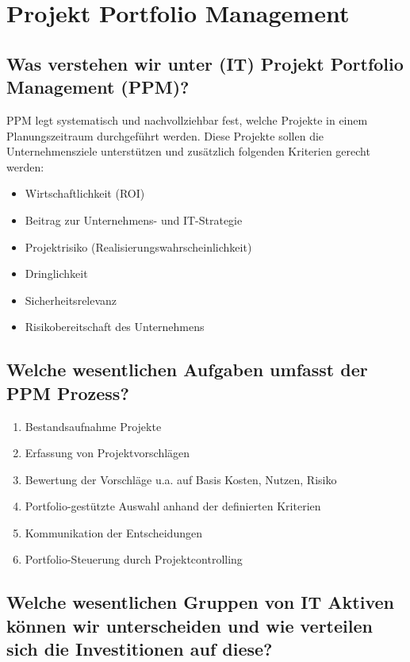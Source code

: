 \chapter{Projekt Portfolio Management}

\section{Was verstehen wir unter (IT) Projekt Portfolio Management (PPM)?}

PPM legt systematisch und nachvollziehbar fest, welche Projekte in einem Planungszeitraum durchgeführt werden. Diese Projekte sollen die Unternehmensziele unterstützen und zusätzlich folgenden Kriterien gerecht werden:
\begin{itemize}
	\item Wirtschaftlichkeit (ROI)
	\item Beitrag zur Unternehmens- und IT-Strategie
	\item Projektrisiko (Realisierungswahrscheinlichkeit)
	\item Dringlichkeit
	\item Sicherheitsrelevanz
	\item Risikobereitschaft des Unternehmens
\end{itemize}

\section{Welche wesentlichen Aufgaben umfasst der PPM Prozess?}

\begin{enumerate}
	\item Bestandsaufnahme Projekte 
	\item Erfassung von Projektvorschlägen
	\item Bewertung der Vorschläge u.a. auf Basis Kosten, Nutzen, Risiko
	\item Portfolio-gestützte Auswahl anhand der definierten Kriterien
	\item Kommunikation der Entscheidungen
	\item Portfolio-Steuerung durch Projektcontrolling
\end{enumerate}

\section{Welche wesentlichen Gruppen von IT Aktiven können wir unterscheiden und wie verteilen sich die Investitionen auf diese?}

